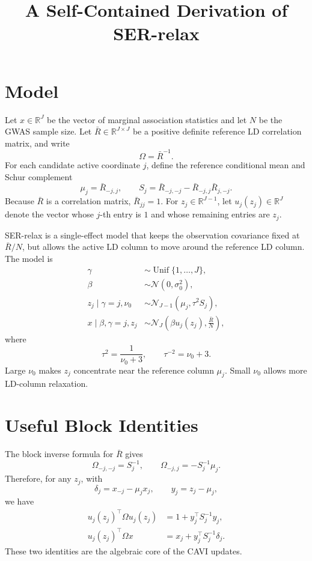 \documentclass[11pt]{article}
\title{A Self-Contained Derivation of SER-relax}
\author{}
\date{}
\newcommand{\Rbar}{\bar R}
\newcommand{\Om}{\Omega}
\newcommand{\Unif}{\operatorname{Unif}}
\newcommand{\Normal}{\mathcal N}
\begin{document}
\maketitle

\section{Model}

Let \(x\in\mathbb R^J\) be the vector of marginal association
statistics and let \(N\) be the GWAS sample size. Let
\(\Rbar\in\mathbb R^{J\times J}\) be a positive definite reference LD
correlation matrix, and write
\[
\Om=\Rbar^{-1}.
\]
For each candidate active coordinate \(j\), define the reference
conditional mean and Schur complement
\[
\mu_j=\Rbar_{-j,j},
\qquad
S_j=\Rbar_{-j,-j}-\Rbar_{-j,j}\Rbar_{j,-j}.
\]
Because \(\Rbar\) is a correlation matrix, \(\Rbar_{jj}=1\). For
\(z_j\in\mathbb R^{J-1}\), let \(u_j(z_j)\in\mathbb R^J\) denote the
vector whose \(j\)-th entry is \(1\) and whose remaining entries are
\(z_j\).

SER-relax is a single-effect model that keeps the observation covariance
fixed at \(\Rbar/N\), but allows the active LD column to move around the
reference LD column. The model is
\begin{align}
\gamma &\sim \Unif\{1,\ldots,J\},\\
\beta &\sim \Normal(0,\sigma_0^2),\\
z_j\mid \gamma=j,\nu_0
&\sim \Normal_{J-1}(\mu_j,\tau^2S_j),\\
x\mid \beta,\gamma=j,z_j
&\sim \Normal_J\left(\beta u_j(z_j),\frac{\Rbar}{N}\right),
\end{align}
where
\[
\tau^2=\frac{1}{\nu_0+3},
\qquad
\tau^{-2}=\nu_0+3.
\]
Large \(\nu_0\) makes \(z_j\) concentrate near the reference column
\(\mu_j\). Small \(\nu_0\) allows more LD-column relaxation.

\section{Useful Block Identities}

The block inverse formula for \(\Rbar\) gives
\[
\Om_{-j,-j}=S_j^{-1},
\qquad
\Om_{-j,j}=-S_j^{-1}\mu_j.
\]
Therefore, for any \(z_j\), with
\[
\delta_j=x_{-j}-\mu_jx_j,
\qquad
y_j=z_j-\mu_j,
\]
we have
\begin{align}
u_j(z_j)^\top\Om u_j(z_j)
&=1+y_j^\top S_j^{-1}y_j, \label{eq:u-Omega-u}\\
u_j(z_j)^\top\Om x
&=x_j+y_j^\top S_j^{-1}\delta_j. \label{eq:u-Omega-x}
\end{align}
These two identities are the algebraic core of the CAVI updates.
\end{document}
